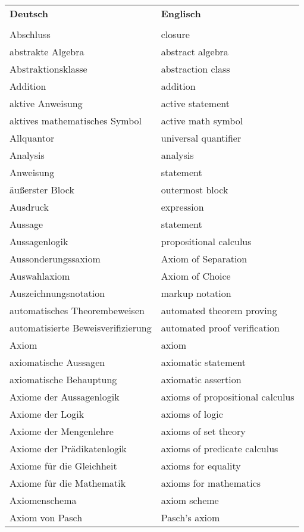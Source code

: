 \begin{longtabu}   { @{} X[l] X[l] }
\textbf{Deutsch} & \textbf{Englisch}\\
 & \\
\endhead
    Abschluss & closure \\
    abstrakte Algebra & abstract algebra \\
    Abstraktionsklasse & abstraction class \\
    Addition & addition \\
    aktive Anweisung & active statement \\
    aktives mathematisches Symbol & active math symbol \\
    Allquantor & universal quantifier \\
    Analysis & analysis \\
    Anweisung & statement   \\
    äußerster Block & outermost block \\
    Ausdruck & expression \\
    Aussage & statement \\
    Aussagenlogik & propositional calculus \\
    Aussonderungssaxiom & Axiom of Separation \\
    Auswahlaxiom & Axiom of Choice \\
    Auszeichnungsnotation & markup notation \\
    automatisches Theorembeweisen & automated theorem proving \\
    automatisierte Beweisverifizierung & automated proof verification \\
    Axiom & axiom \\
    axiomatische Aussagen & axiomatic statement \\
    axiomatische Behauptung & axiomatic assertion \\
    Axiome der Aussagenlogik & axioms of propositional calculus \\
    Axiome der Logik & axioms of logic \\
    Axiome der Mengenlehre & axioms of set theory \\
    Axiome der Prädikatenlogik & axioms of predicate calculus \\
    Axiome für die Gleichheit & axioms for equality  \\
    Axiome für die Mathematik & axioms for mathematics \\
    Axiomenschema & axiom scheme \\
    Axiom von Pasch & Pasch's axiom \\

\end{longtabu}
